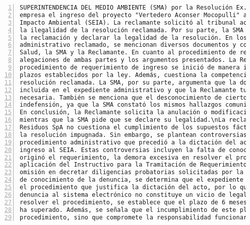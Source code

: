 \begin{Verbatim}[frame=lines, label=Elavoración propia -  Ejemplo de Contexto enviado por el Chatbot a OpenAI
				, fontsize=\scriptsize, numbers=left
				, baselinestretch=0.4
				, formatcom=\color{gray}]
SUPERINTENDENCIA DEL MEDIO AMBIENTE (SMA) por la Resolución Ex. N° 427, que requería a la
empresa el ingreso del proyecto "Vertedero Aconser Mocopulli" al Sistema de Evaluación de
Impacto Ambiental (SEIA). La reclamante solicitó al tribunal acoger su reclamación y declarar
la ilegalidad de la resolución reclamada. Por su parte, la SMA solicitó al tribunal rechazar
la reclamación y declarar la legalidad de la resolución. En los antecedentes del acto
administrativo reclamado, se mencionan diversos documentos y comunicaciones entre la SEREMI de
Salud, la SMA y la Reclamante. En cuanto al procedimiento de reclamación, se detallan las
alegaciones de ambas partes y los argumentos presentados. La Reclamante argumenta que el
procedimiento de requerimiento de ingreso se inició de manera irregular y que se violaron
plazos establecidos por la ley. Además, cuestiona la competencia de la SMA para dictar la
resolución reclamada. La SMA, por su parte, argumenta que la documentación relevante está
incluida en el expediente administrativo y que la Reclamante tuvo acceso a la información
necesaria. También se menciona que el desconocimiento de ciertos documentos no supone
indefensión, ya que la SMA constató los mismos hallazgos comunicados por la SEREMI de Salud.
En conclusión, la Reclamante solicita la anulación o modificación de la resolución reclamada,
mientras que la SMA pide que se declare su legalidad.\nLa reclamación presentada por ACONSER
Residuos SpA no cuestiona el cumplimiento de los supuestos fácticos y jurídicos contenidos en
la resolución impugnada. Sin embargo, se plantean controversias relacionadas con el
procedimiento administrativo que precedió a la dictación del acto terminal de requerimiento de
ingreso al SEIA. Estas controversias incluyen la falta de conocimiento de la denuncia que
originó el requerimiento, la demora excesiva en resolver el procedimiento, la omisión en la
aplicación del Instructivo para la Tramitación de Requerimientos de Ingreso al SEIA y la
omisión en decretar diligencias probatorias solicitadas por la interesada. Respecto a la falta
de conocimiento de la denuncia, se determina que el expediente administrativo físico contiene
el procedimiento que justifica la dictación del acto, por lo que la tardanza en incorporar la
denuncia al sistema electrónico no constituye un vicio de legalidad. En cuanto a la demora en
resolver el procedimiento, se establece que el plazo de 6 meses establecido por la ley no se
ha superado. Además, se señala que el incumplimiento de este plazo no afecta la validez del
procedimiento, sino que compromete la responsabilidad funcionaria. En relación a la omisión en

\end{Verbatim}
